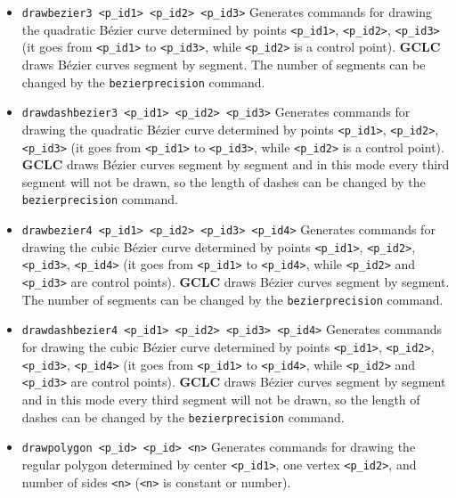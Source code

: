 \documentclass[a4paper]{book}
\newcommand{\gclc}{{\bfseries GCLC}\xspace}
\begin{document}
\begin{itemize}
\item \verb|drawbezier3 <p_id1> <p_id2> <p_id3>|
        Generates com\-mands for drawing the quadratic Bézier
        curve determined by points \verb|<p_id1>|, \verb|<p_id2>|,
        \verb|<p_id3>| (it goes from \verb|<p_id1>| to \verb|<p_id3>|,
        while \verb|<p_id2>| is a control point).
        \gclc draws Bézier curves segment by segment. The number of
        segments can be changed by the \verb|bezierprecision| command.

\item \verb|drawdashbezier3 <p_id1> <p_id2> <p_id3>|
        Generates com\-mands for drawing the quadratic Bézier
        curve determined by points \verb|<p_id1>|, \verb|<p_id2>|,
        \verb|<p_id3>| (it goes from \verb|<p_id1>| to \verb|<p_id3>|,
        while \verb|<p_id2>| is a control point).
        \gclc draws Bézier curves segment by segment and in this
        mode every third segment will not be drawn, so the length
        of dashes can be changed by the \verb|bezierprecision| command.

\item \verb|drawbezier4 <p_id1> <p_id2> <p_id3> <p_id4>|
        Generates com\-mands for drawing the cubic Bézier
        curve determined by points \verb|<p_id1>|, \verb|<p_id2>|,
        \verb|<p_id3>|, \verb|<p_id4>| (it goes from \verb|<p_id1>|
        to \verb|<p_id4>|,  while \verb|<p_id2>| and \verb|<p_id3>|
        are control points).
        \gclc draws Bézier curves segment by segment. The number of
        segments can be changed by the \verb|bezierprecision| command.

\item \verb|drawdashbezier4 <p_id1> <p_id2> <p_id3> <p_id4>|
        Generates com\-mands for drawing the cubic Bézier
        curve determined by points \verb|<p_id1>|, \verb|<p_id2>|,
        \verb|<p_id3>|, \verb|<p_id4>| (it goes from \verb|<p_id1>|
        to \verb|<p_id4>|,  while \verb|<p_id2>| and \verb|<p_id3>|
        are control points).
        \gclc draws Bézier curves segment by segment and in this
        mode every third segment will not be drawn, so the length
        of dashes can be changed by the \verb|bezierprecision| command.

\item \verb|drawpolygon <p_id> <p_id> <n>|
        Generates commands for drawing the regular polygon
        determined by center \verb|<p_id1>|, one vertex
        \verb|<p_id2>|, and number of sides \verb|<n>|
        (\verb|<n>| is constant or {\sc number}).


\end{itemize}
\end{document}
